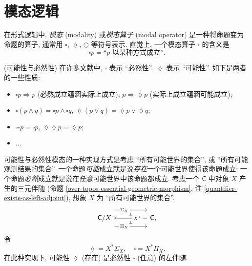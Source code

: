 \section{模态逻辑}

\label{appendix-modal-logic}

在形式逻辑中, \emph{模态} (modality) 或\emph{模态算子} (modal operator) 是一种将命题变为命题的算子, 通常用 $\square$, $\lozenge$, $\bigcirc$ 等符号表示. 直觉上, 一个模态算子 $\square$ 的含义是
$$\square p = \text{``$p$ 以某种方式成立''}.$$

\begin{example}
	{(可能性与必然性)}
	在许多文献中, $\square$ 表示 ``必然性'', $\lozenge$ 表示 ``可能性''. 如下是两者的一些性质:
	\begin{itemize}
		\item $\square p \Rightarrow p$ (必然成立蕴涵实际上成立), $p\Rightarrow \lozenge p$ (实际上成立蕴涵可能成立);
		\item $\square (p \land q) = \square p \land \square q$, $\lozenge (p\lor q) = \lozenge p \lor \lozenge q$;
		\item $\square\square p = \square p$, $\lozenge\lozenge p =\lozenge p$;
		\item ...
	\end{itemize}
	可能性与必然性模态的一种实现方式是考虑 ``所有可能世界的集合'', 或 ``所有可能观测结果的集合''. 一个命题\emph{可能}成立就是说\emph{存在}一个可能世界使得该命题成立; 一个命题\emph{必然}成立就是说在\emph{任意}可能世界中该命题都成立.
	考虑一个\topos{} $\mathsf C$ 中对象 $X$ 产生的三元伴随 (命题 \ref{over-topos-essential-geometric-morphism}, 注 \ref{quantifier-exists-as-left-adjoint}),
	想象 $X$ 为 ``所有可能世界的集合''.
	\[\begin{tikzcd}[ampersand replacement=\&,background color=\examplecolor]
		{\mathsf C/X} \&\& {\mathsf C,}
		\arrow[""{name=0, anchor=center, inner sep=0}, "{X^*}"{description, pos=0.3}, from=1-3, to=1-1]
		\arrow[""{name=1, anchor=center, inner sep=0}, "{\Sigma_X}"{description, pos=0.3}, shift left=5, from=1-1, to=1-3]
		\arrow[""{name=2, anchor=center, inner sep=0}, "{\Pi_X}"{description, pos=0.3}, shift right=5, from=1-1, to=1-3]
		\arrow["\dashv"{anchor=center, rotate=-90}, draw=none, from=1, to=0]
		\arrow["\dashv"{anchor=center, rotate=-90}, draw=none, from=0, to=2]
	\end{tikzcd}\]
	令
	$$
	\lozenge = X^*\Sigma_X,\quad
	\square = X^*\Pi_X.
	$$
	在此种实现下, 可能性 $\lozenge$ (存在) 是必然性 $\square$ (任意) 的左伴随.
\end{example}